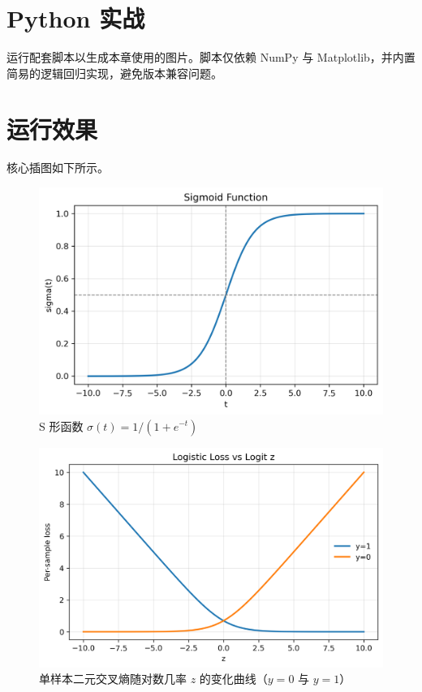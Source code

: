 \documentclass[UTF8,zihao=-4]{ctexart}
\begin{document}
\section{Python 实战}
运行配套脚本以生成本章使用的图片。脚本仅依赖 NumPy 与 Matplotlib，并内置简易的逻辑回归实现，避免版本兼容问题。



\section{运行效果}
核心插图如下所示。

\begin{figure}[H]
  \centering
  \includegraphics[width=0.65\linewidth]{sigmoid_curve.png}
  \caption{S 形函数 $\sigma(t)=1/(1+e^{-t})$}
  \label{fig:sigmoid}
\end{figure}

\begin{figure}[H]
  \centering
  \includegraphics[width=0.7\linewidth]{logistic_loss_curves.png}
  \caption{单样本二元交叉熵随对数几率 $z$ 的变化曲线（$y=0$ 与 $y=1$）}
  \label{fig:loss}
\end{figure}
\end{document}
